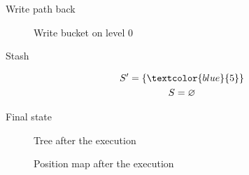 	\begin{frame}{Write path back}

		\selectedtrue
		\pathreadtrue

		\nodeonenewtrue
		\nodetwonewtrue
		\nodethreenewtrue
		\nodefournewtrue

		\begin{figure}
			\centering

			
			\caption{Write bucket on level $0$}
		\end{figure}
		
		\vspace{-12pt}

		\begin{block}{Stash}
			
			\begin{gather*}
				S^\prime = \{ \textcolor{blue}{5} \} \\
				S = \varnothing
			\end{gather*}

		\end{block}

	\end{frame}

	\begin{frame}{Final state}

		\selectedtrue
		\pathreadtrue

		\nodeonenewtrue
		\nodetwonewtrue
		\nodethreenewtrue
		\nodefournewtrue

		\begin{figure}
			\centering

			
			\caption{Tree after the execution}
		\end{figure}

		\vspace{-12pt}
		
		\begin{figure}
			\centering

			
			\caption{Position map after the execution}
		\end{figure}
		
	\end{frame}
